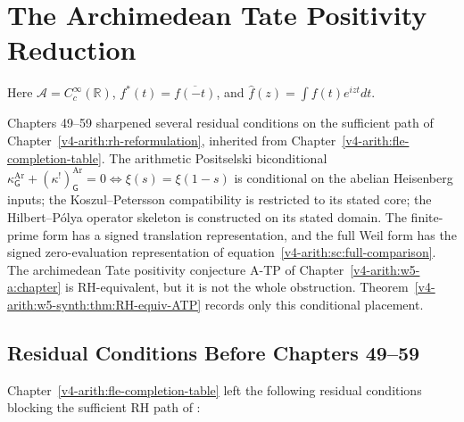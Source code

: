 \chapter{The Archimedean Tate Positivity Reduction}
\label{v4-arith:w5-synth:chapter}

Here $\mathscr A=C_c^\infty(\mathbb R)$, $f^*(t)=\overline{f(-t)}$,
and $\widehat f(z)=\int f(t)e^{izt}dt$.

Chapters 49--59 sharpened several residual conditions on the
sufficient path of
Chapter~\ref{v4-arith:rh-reformulation}, inherited from
Chapter~\ref{v4-arith:fle-completion-table}. The arithmetic
Positselski biconditional
\(\kappa^{\mathrm{Ar}}_{\mathsf{G}}+(\kappa^{!})^{\mathrm{Ar}}_{\mathsf{G}}=0
\Leftrightarrow \xi(s)=\xi(1-s)\)
is conditional on the abelian Heisenberg inputs; the
Koszul--Petersson compatibility is restricted to its stated core; the
Hilbert--P\'{o}lya operator skeleton is constructed on its stated
domain. The finite-prime form has a signed translation representation,
and the full Weil form has the signed zero-evaluation representation
of equation~\eqref{v4-arith:sc:full-comparison}.  The
archimedean Tate positivity conjecture A-TP of
Chapter~\ref{v4-arith:w5-a:chapter} is RH-equivalent, but it is not
the whole obstruction.
Theorem~\ref{v4-arith:w5-synth:thm:RH-equiv-ATP} records only this
conditional placement.

\section{Residual Conditions Before Chapters 49--59}
\label{v4-arith:w5-synth:domain}

Chapter~\ref{v4-arith:fle-completion-table} left the following
residual conditions blocking the sufficient RH path of
:


